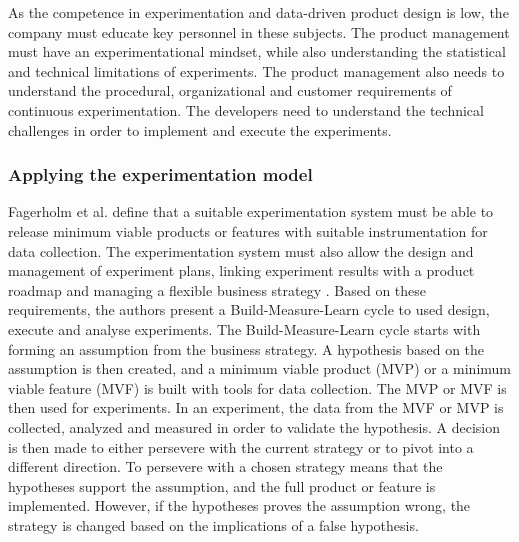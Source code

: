 \documentclass[english]{tktltiki2}
\theoremstyle{definition}
\theoremstyle{remark}
\begin{document}
As the competence in experimentation and data-driven product design is low, the company must educate key personnel in these subjects. The product management must have an experimentational mindset, while also understanding the statistical and technical limitations of experiments. The product management also needs to understand the procedural, organizational and customer requirements of continuous experimentation. The developers need to understand the technical challenges in order to implement and execute the experiments.






\subsubsection{Applying the experimentation model}
Fagerholm et al. define that a suitable experimentation system must be able to release minimum viable products or features with suitable instrumentation for data collection. The experimentation system must also allow the design and management of experiment plans, linking experiment results with a product roadmap and managing a flexible business strategy \cite{fagerholm2014building}. Based on these requirements, the authors present a Build-Measure-Learn cycle to used design, execute and analyse experiments. The Build-Measure-Learn cycle starts with forming an assumption from the business strategy. A hypothesis based on the assumption is then created, and a minimum viable product (MVP) or a minimum viable feature (MVF) is built with tools for data collection. The MVP or MVF is then used for experiments. In an experiment, the data from the MVF or MVP is collected, analyzed and measured in order to validate the hypothesis. A decision is then made to either persevere with the current strategy or to pivot into a different direction. To persevere with a chosen strategy means that the hypotheses support the assumption, and the full product or feature is implemented. However, if the hypotheses proves the assumption wrong, the strategy is changed based on the implications of a false hypothesis.
\end{document}
